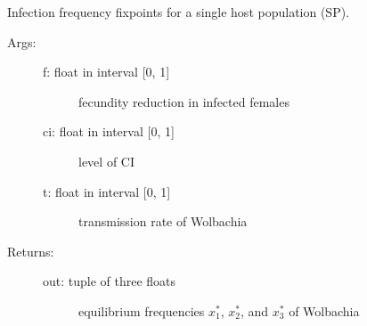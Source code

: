 \documentclass[letterpaper,10pt,english]{sphinxmanual}
\begin{document}
\begin{fulllineitems}
\label{index:wspec.analytical.fix_SP}
Infection frequency fixpoints for a single host population (SP).
\begin{description}
\item[{Args:}] \leavevmode\begin{description}
\item[{f: float in interval {[}0, 1{]}}] \leavevmode
fecundity reduction in infected females

\item[{ci: float in interval {[}0, 1{]}}] \leavevmode
level of CI

\item[{t: float in interval {[}0, 1{]}}] \leavevmode
transmission rate of Wolbachia

\end{description}

\item[{Returns:}] \leavevmode\begin{description}
\item[{out: tuple of three floats}] \leavevmode
equilibrium frequencies $x_1^{\ast}$, $x_2^{\ast}$, and $x_3^{\ast}$ of Wolbachia

\end{description}

\end{description}

\end{fulllineitems}

\end{document}
